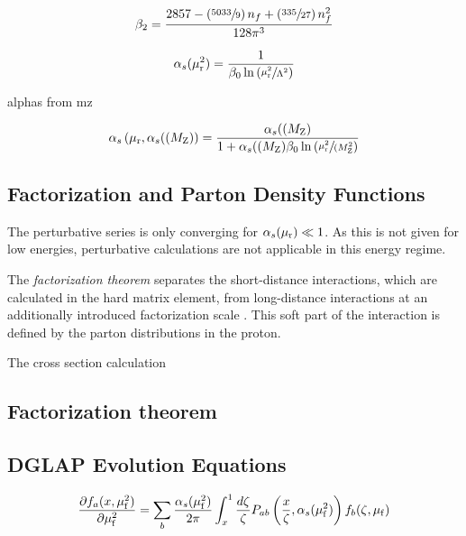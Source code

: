 \begin{equation} 
   \beta_2 = \frac{2857 -\left(\sfrac{5033}{9}\right)n_f + \left(\sfrac{335}{27}
   \right)n_f^2}{128 \pi^3}
\end{equation}

\begin{equation*}
   \alpha_{s}(\mu_{\mathrm{r}}^2) = \frac{1}{\beta_0 \ln \left( \sfrac{\mu_{\mathrm{r}}^2}{\Lambda^2} \right)}
\end{equation*}


alphas from mz

\begin{equation*}
   \alpha_{s}\left(\mu_{\mathrm{r}}, \alpha_{s}((M_\mathrm{Z})\right) = \frac{\alpha_{s}((M_\mathrm{Z})}{1 + \alpha_{s}((M_\mathrm{Z})\beta_0 \ln
       \left( \sfrac{\mu_{\mathrm{r}}^2}{(M_\mathrm{Z}^2} \right)}
\end{equation*}

\subsection{Factorization and Parton Density Functions}

The perturbative series is only converging for $\alpha_{s}(\mu_{\mathrm{r}}) \ll 1$. As this is not
given for low energies, perturbative calculations are not applicable in this
energy regime. 

The \emph{factorization theorem} separates the short-distance interactions,
which are calculated in the hard matrix element, from long-distance
interactions at an additionally introduced factorization scale \muf. This soft
part of the interaction is defined by the parton distributions in the proton.

The cross section calculation 

\subsection{Factorization theorem}
\label{sec:factorization_theorem}


\subsection{DGLAP Evolution Equations}



\begin{equation*}
    \frac{\partial f_a (x, \mu_{\mathrm{f}}^2)}{\partial \mu_{\mathrm{f}}^2} = \sum_b \frac{\alpha_{s}(\mu_{\mathrm{f}}^2)}{2 \pi} \int_x^1
    \frac{d \zeta}{\zeta} P_{ab} \left(\frac{x}{\zeta},
    \alpha_{s}(\mu_{\mathrm{f}}^2)\right) f_b(\zeta, \mu_{\mathrm{f}})
\end{equation*}



